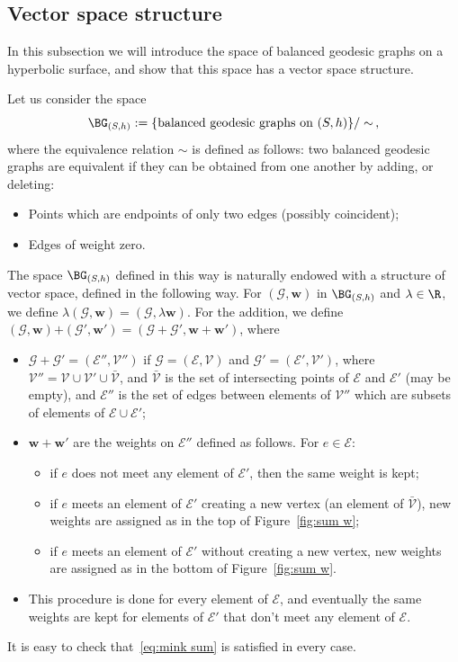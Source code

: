 \subsection{Vector space structure}
In this subsection we will introduce the space of balanced geodesic graphs on a hyperbolic surface, and show that this space has a vector space structure.

Let us consider the space
\[
\BG_{(S,h)}:=\{\text{balanced geodesic graphs on }(S,h)\}/\sim\,,
\]
where the equivalence relation $\sim$ is defined as follows: two balanced geodesic graphs are equivalent if they can be obtained from one another by adding, or deleting:
\begin{itemize}
\item Points which are endpoints of only two edges (possibly coincident);
\item Edges of weight zero.
\end{itemize}
The space $\BG_{(S,h)}$ defined in this way is naturally endowed with a structure of vector space, defined in the following way. For $(\mathcal{G},\mathbf w)$ in $\BG_{(S,h)}$ and $\lambda\in \R$, we define $\lambda (\mathcal{G},\mathbf w)=(\mathcal{G},\lambda \mathbf w)$. For the addition, we define $(\mathcal{G},\mathbf w)\textbf{+}(\mathcal{G}',\mathbf w')= (\mathcal{G}+\mathcal{G}',\mathbf w+\mathbf w')$, where
\begin{itemize}
\item $\mathcal{G}+\mathcal{G}'=(\mathcal E'',\mathcal V'')$ if $\mathcal{G}=(\mathcal E,\mathcal V)$ and $\mathcal{G}'=(\mathcal E',\mathcal V')$, where $\mathcal V''=\mathcal V \cup \mathcal V' \cup \bar{\mathcal V}$, and $\bar{\mathcal{V}}$ is the set of intersecting points of $\mathcal E$ and $\mathcal E'$ (may be empty), and $\mathcal E''$ is the set of edges between elements of $\mathcal V''$ which are subsets of elements of $\mathcal E\cup \mathcal E'$;
\item $\mathbf w+\mathbf w'$ are the weights on $\mathcal E''$ defined as follows. For $e\in \mathcal E$:
\begin{itemize}
\item if $e$ does not meet any element of $\mathcal E'$, then the same weight is kept;
\item if $e$ meets an element of $\mathcal E'$ creating a new vertex (an element of $\bar{\mathcal{V}}$), new weights are assigned as in the top of Figure~\ref{fig:sum w};
\item if $e$ meets an element of $\mathcal E'$ without creating a new vertex, new weights are assigned as in the bottom of Figure~\ref{fig:sum w}.
\end{itemize}
\item This procedure is done for every element of $\mathcal E$, and eventually the same weights are kept for elements of $\mathcal E'$ that don't meet any element of $\mathcal E$.
\end{itemize}
It is easy to check that~\eqref{eq:mink sum} is satisfied in every case.


